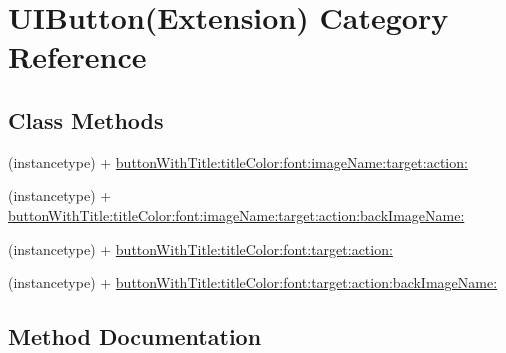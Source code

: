 \hypertarget{category_u_i_button_07_extension_08}{}\section{U\+I\+Button(Extension) Category Reference}
\label{category_u_i_button_07_extension_08}
\subsection*{Class Methods}
\begin{DoxyCompactItemize}
\item 
(instancetype) + \mbox{\hyperlink{category_u_i_button_07_extension_08_a444999f93a78322fb470602b43cbea34}{button\+With\+Title\+:title\+Color\+:font\+:image\+Name\+:target\+:action\+:}}
\item 
(instancetype) + \mbox{\hyperlink{category_u_i_button_07_extension_08_ac27083123dda6991cbac6cd8c286f03e}{button\+With\+Title\+:title\+Color\+:font\+:image\+Name\+:target\+:action\+:back\+Image\+Name\+:}}
\item 
(instancetype) + \mbox{\hyperlink{category_u_i_button_07_extension_08_a4f18864658ec3e323ca86daa5bf00bd4}{button\+With\+Title\+:title\+Color\+:font\+:target\+:action\+:}}
\item 
(instancetype) + \mbox{\hyperlink{category_u_i_button_07_extension_08_ace556c8a535ed59e6f9d48c3446183d1}{button\+With\+Title\+:title\+Color\+:font\+:target\+:action\+:back\+Image\+Name\+:}}
\end{DoxyCompactItemize}


\subsection{Method Documentation}
\mbox{\label{category_u_i_button_07_extension_08_a444999f93a78322fb470602b43cbea34}} 
